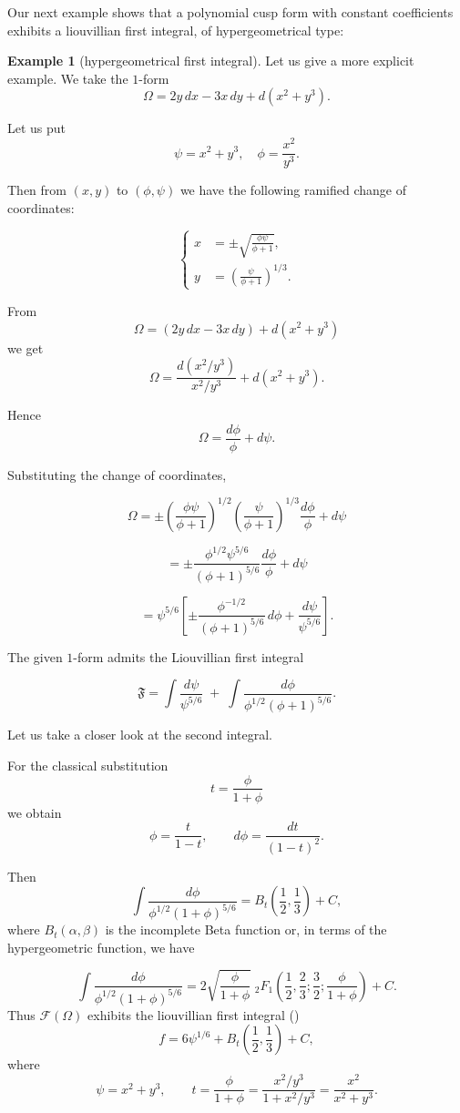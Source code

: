 \documentclass[11pt,a4paper]{amsart}
\theoremstyle{definition}
\newtheorem{example}[theorem]{Example}
\begin{document}
Our next example shows that a polynomial cusp form with constant coefficients exhibits a liouvillian first integral, of hypergeometrical type: 
\begin{example}[hypergeometrical first integral]
\label{example:hypergeometricalcusp}
Let us give a more explicit example.
We take the $1$-form
\[
\Omega = 2y\,dx - 3x\,dy + d(x^2+y^3).
\]

Let us put
\[
\psi = x^2+y^3,
\quad
\phi = \frac{x^2}{y^3}.
\]

Then from $(x,y)$ to $(\phi,\psi)$
we have the following ramified
change of coordinates:

\[
\left\{
\begin{aligned}
x &= \pm \sqrt{\frac{\phi\psi}{\phi+1}},\\
y &= \left(\frac{\psi}{\phi+1}\right)^{1/3}.
\end{aligned}
\right.
\]

From
\[
\Omega = (2y\,dx - 3x\,dy) + d(x^2+y^3)
\]
we get
\[
\Omega
=
\frac{d(x^2/y^3)}{x^2/y^3}
+
d(x^2+y^3).
\]

Hence
\[
\Omega = \frac{d\phi}{\phi} + d\psi.
\]

Substituting the change of coordinates,

\[
\Omega
=
\pm
\left(\frac{\phi\psi}{\phi+1}\right)^{1/2}
\left(\frac{\psi}{\phi+1}\right)^{1/3}
\frac{d\phi}{\phi}
+
d\psi
\]

\[
=
\pm
\frac{\phi^{1/2}\psi^{5/6}}{(\phi+1)^{5/6}}
\frac{d\phi}{\phi}
+
d\psi
\]

\[
=
\psi^{5/6}
\left[
\pm
\frac{\phi^{-1/2}}{(\phi+1)^{5/6}}\,d\phi
+
\frac{d\psi}{\psi^{5/6}}
\right].
\]



The given $1$-form admits the Liouvillian
first integral

\[
\mathfrak{F}=\int \frac{d\psi}{\psi^{5/6}}
\;+\;
\int
\frac{d\phi}{\phi^{1/2}(\phi+1)^{5/6}}.
\]

Let us take a closer look at the
second integral.

For the classical substitution
\[
t=\frac{\phi}{1+\phi}
\]
we obtain
\[
\phi=\frac{t}{1-t},
\qquad
d\phi=\frac{dt}{(1-t)^2}.
\]

Then
\[
\int
\frac{d\phi}{\phi^{1/2}(1+\phi)^{5/6}}
=
B_t\!\left(\frac12,\frac13\right)
+
C,
\]
where $B_t(\alpha,\beta)$ is the incomplete
Beta function or, in terms of the hypergeometric function,
we have

\[
\int
\frac{d\phi}{\phi^{1/2}(1+\phi)^{5/6}}
=
2\sqrt{\frac{\phi}{1+\phi}}\;
{}_2F_1
\!\left(
\frac12,\frac23;\frac32;\frac{\phi}{1+\phi}
\right)
+
C.
\]
Thus $\mathcal{F}(\Omega)$ exhibits the liouvillian first integral (\cite{C-S ETDS})
\[
f
= 6\psi^{1/6}
+ B_t\!\left(\frac12,\frac13\right)+C,
\]
where
\[
\psi=x^2+y^3,
\qquad
t=\frac{\phi}{1+\phi}
=\frac{x^2/y^3}{1+x^2/y^3}
=\frac{x^2}{x^2+y^3}.
\]


\end{example}
\end{document}
